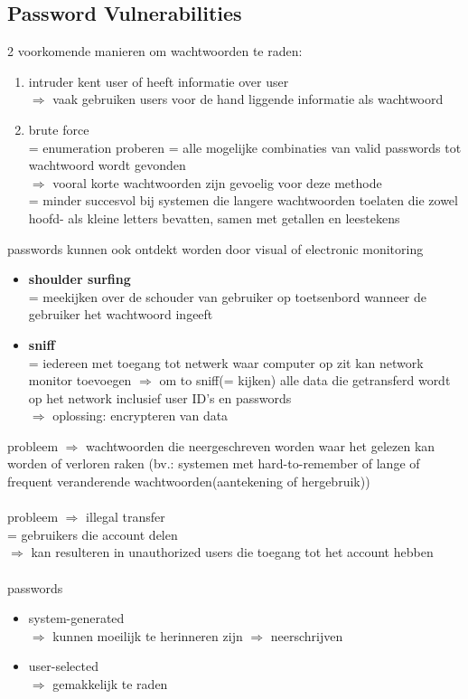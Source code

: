 \documentclass{report}
\begin{document}
\subsection{Password Vulnerabilities}
2 voorkomende manieren om wachtwoorden te raden:
\begin{enumerate}
\item intruder kent user of heeft informatie over user
\\$\Rightarrow$ vaak gebruiken users voor de hand liggende informatie als wachtwoord
\item brute force
\\= enumeration proberen = alle mogelijke combinaties van valid passwords tot wachtwoord wordt gevonden
\\$\Rightarrow$ vooral korte wachtwoorden zijn gevoelig voor deze methode
\\= minder succesvol bij systemen die langere wachtwoorden toelaten die zowel hoofd- als kleine letters bevatten, samen met getallen en leestekens
\end{enumerate}
passwords kunnen ook ontdekt worden door visual of electronic monitoring
\begin{itemize}
\item \textbf{shoulder surfing} 
\\ = meekijken over de schouder van gebruiker op toetsenbord wanneer de gebruiker het wachtwoord ingeeft 
\item \textbf{sniff}
\\= iedereen met toegang tot netwerk waar computer op zit kan network monitor toevoegen $\Rightarrow$ om to sniff(= kijken) alle data die getransferd wordt op het network inclusief user ID's en passwords
\\$\Rightarrow$ oplossing: encrypteren van data 
\end{itemize}
probleem $\Rightarrow$ wachtwoorden die neergeschreven worden waar het gelezen kan worden of verloren raken (bv.: systemen met hard-to-remember of lange of frequent veranderende wachtwoorden(aantekening of hergebruik))
\\
\\probleem $\Rightarrow$ illegal transfer
\\= gebruikers die account delen
\\ $\Rightarrow$ kan resulteren in unauthorized users die toegang tot het account hebben
\\
\\passwords
\begin{itemize}
\item system-generated
\\$\Rightarrow$ kunnen moeilijk te herinneren zijn $\Rightarrow$ neerschrijven 
\item user-selected
\\$\Rightarrow$ gemakkelijk te raden
\end{itemize}
\end{document}
